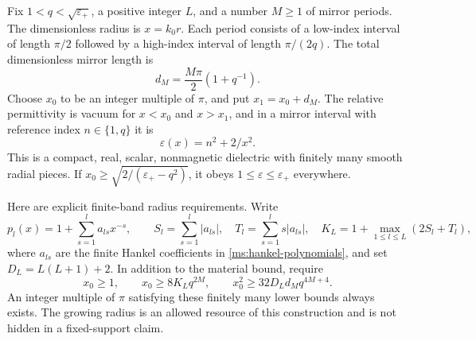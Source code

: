 Fix $1<q<\sqrt{\varepsilon_+}$, a positive integer $L$, and a
number $M\geq1$ of mirror periods.  The dimensionless radius is
$x=k_0r$.  Each period consists of a low-index interval of length
$\pi/2$ followed by a high-index interval of length $\pi/(2q)$.
The total dimensionless mirror length is
\begin{equation}\label{cg:length}
 d_M=\frac{M\pi}{2}(1+q^{-1}).
\end{equation}
Choose $x_0$ to be an integer multiple of $\pi$, and put
$x_1=x_0+d_M$.  The relative permittivity is vacuum for $x<x_0$
and $x>x_1$, and in a mirror interval with reference index
$n\in\{1,q\}$ it is
\begin{equation}\label{cg:material}
 \varepsilon(x)=n^2+2/x^2.
\end{equation}
This is a compact, real, scalar, nonmagnetic dielectric with finitely
many smooth radial pieces.  If
$x_0\geq\sqrt{2/(\varepsilon_+-q^2)}$, it obeys
$1\leq\varepsilon\leq\varepsilon_+$ everywhere.

Here are explicit finite-band radius requirements.  Write
\begin{equation}\label{cg:hankel-constants}
 p_l(x)=1+\sum_{s=1}^l a_{ls}x^{-s},\qquad
 S_l=\sum_{s=1}^l|a_{ls}|,\quad
 T_l=\sum_{s=1}^l s|a_{ls}|,\quad
 K_L=1+\max_{1\leq l\leq L}(2S_l+T_l),
\end{equation}
where $a_{ls}$ are the finite Hankel coefficients in
\eqref{ms:hankel-polynomials}, and set $D_L=L(L+1)+2$.
In addition to the material bound, require
\begin{equation}\label{cg:radius-choice}
 x_0\geq1,\qquad
 x_0\geq 8K_L q^{2M},\qquad
 x_0^2\geq32 D_Ld_Mq^{4M+4}.
\end{equation}
An integer multiple of $\pi$ satisfying these finitely many lower
bounds always exists.  The growing radius is an allowed resource
of this construction and is not hidden in a fixed-support claim.

